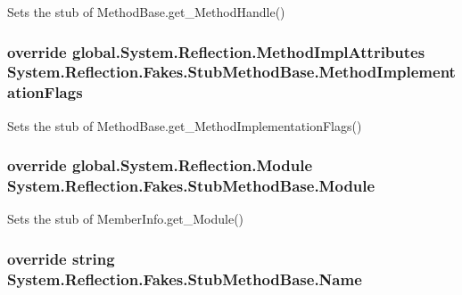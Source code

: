 Sets the stub of Method\-Base.\-get\-\_\-\-Method\-Handle()

\hypertarget{class_system_1_1_reflection_1_1_fakes_1_1_stub_method_base_a2febd72d58582b9c44714bfd1fde3327}{
\subsubsection[{Method\-Implementation\-Flags}]{\setlength{\rightskip}{0pt plus 5cm}override global.\-System.\-Reflection.\-Method\-Impl\-Attributes System.\-Reflection.\-Fakes.\-Stub\-Method\-Base.\-Method\-Implementation\-Flags\hspace{0.3cm}{\ttfamily [get]}}}\label{class_system_1_1_reflection_1_1_fakes_1_1_stub_method_base_a2febd72d58582b9c44714bfd1fde3327}


Sets the stub of Method\-Base.\-get\-\_\-\-Method\-Implementation\-Flags()

\hypertarget{class_system_1_1_reflection_1_1_fakes_1_1_stub_method_base_af77c82cd08f6e5b625121d1c3bfa085b}{
\subsubsection[{Module}]{\setlength{\rightskip}{0pt plus 5cm}override global.\-System.\-Reflection.\-Module System.\-Reflection.\-Fakes.\-Stub\-Method\-Base.\-Module\hspace{0.3cm}{\ttfamily [get]}}}\label{class_system_1_1_reflection_1_1_fakes_1_1_stub_method_base_af77c82cd08f6e5b625121d1c3bfa085b}


Sets the stub of Member\-Info.\-get\-\_\-\-Module()

\hypertarget{class_system_1_1_reflection_1_1_fakes_1_1_stub_method_base_abe26f3b140655f7c23cfaa1e38f88c8f}{
\subsubsection[{Name}]{\setlength{\rightskip}{0pt plus 5cm}override string System.\-Reflection.\-Fakes.\-Stub\-Method\-Base.\-Name\hspace{0.3cm}{\ttfamily [get]}}}\label{class_system_1_1_reflection_1_1_fakes_1_1_stub_method_base_abe26f3b140655f7c23cfaa1e38f88c8f}


